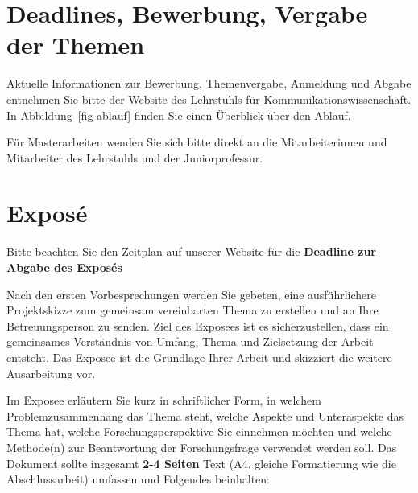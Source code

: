 \documentclass[
  letterpaper,
  DIV=11]{scrreprt}
\begin{document}
\section{Deadlines, Bewerbung, Vergabe der
Themen}\label{deadlines-bewerbung-vergabe-der-themen}

Aktuelle Informationen zur Bewerbung, Themenvergabe, Anmeldung und
Abgabe entnehmen Sie bitte der Website des
\href{https://www.kowi.rw.fau.de/studium/abschlussarbeiten/}{Lehrstuhls
für Kommunikationswissenschaft}. In Abbildung~\ref{fig-ablauf} finden
Sie einen Überblick über den Ablauf.

Für Masterarbeiten wenden Sie sich bitte direkt an die Mitarbeiterinnen
und Mitarbeiter des Lehrstuhls und der Juniorprofessur.

\section{Exposé}\label{exposuxe9}

Bitte beachten Sie den Zeitplan auf unserer Website für die
\textbf{Deadline zur Abgabe des Exposés}

Nach den ersten Vorbesprechungen werden Sie gebeten, eine ausführlichere
Projektskizze zum gemeinsam vereinbarten Thema zu erstellen und an Ihre
Betreuungsperson zu senden. Ziel des Exposees ist es sicherzustellen,
dass ein gemeinsames Verständnis von Umfang, Thema und Zielsetzung der
Arbeit entsteht. Das Exposee ist die Grundlage Ihrer Arbeit und
skizziert die weitere Ausarbeitung vor.

Im Exposee erläutern Sie kurz in schriftlicher Form, in welchem
Problemzusammenhang das Thema steht, welche Aspekte und Unteraspekte das
Thema hat, welche Forschungsperspektive Sie einnehmen möchten und welche
Methode(n) zur Beantwortung der Forschungsfrage verwendet werden soll.
Das Dokument sollte insgesamt \textbf{2-4 Seiten} Text (A4, gleiche
Formatierung wie die Abschlussarbeit) umfassen und Folgendes beinhalten:
\end{document}

